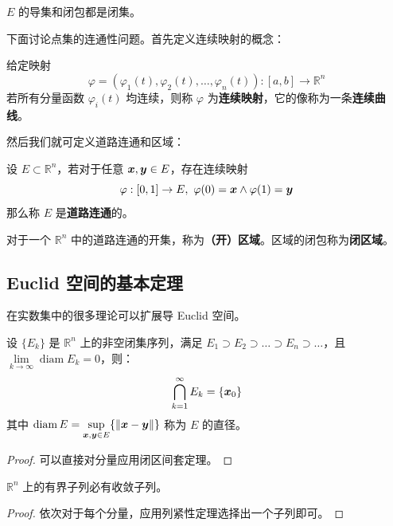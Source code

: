 \begin{theorem}
    $E$ 的导集和闭包都是闭集。
\end{theorem}

下面讨论点集的连通性问题。首先定义连续映射的概念：

\begin{definition}
    给定映射
    $$
    \varphi = (\varphi_1(t), \varphi_2(t), \dots, \varphi_n(t)): [a, b] \to \mathbb{R}^{n}
    $$
    若所有分量函数 $\varphi_i(t)$ 均连续，则称 $\varphi$ 为\textbf{连续映射}，它的像称为一条\textbf{连续曲线}。
\end{definition}

然后我们就可定义道路连通和区域：

\begin{definition}[道路连通]
    设 $E \subset \mathbb{R}^{n}$，若对于任意 $\boldsymbol{x}, \boldsymbol{y} \in E$，存在连续映射
    $$
    \varphi: [0, 1] \to E,\ \varphi(0) = \boldsymbol{x} \land \varphi(1) = \boldsymbol{y}
    $$
    那么称 $E$ 是\textbf{道路连通}的。
\end{definition}

\begin{definition}[区域]
    对于一个 $\mathbb{R}^{n}$ 中的道路连通的开集，称为\textbf{（开）区域}。区域的闭包称为\textbf{闭区域}。
\end{definition}

\subsection{Euclid 空间的基本定理}

在实数集中的很多理论可以扩展导 Euclid 空间。

\begin{theorem}[闭集套定理]
    设 $\{E_k\}$ 是 $\mathbb{R}^{n}$ 上的非空闭集序列，满足 $E_1 \supset E_2 \supset \dots \supset E_n \supset \dots$，且 $\lim\limits_{k \to \infty} \operatorname{diam} E_k = 0$，则：
    $$ 
    \bigcap_{k=1}^{\infty} E_k = \{\boldsymbol{x}_0\}
    $$
    其中 $\operatorname{diam} E = \sup\limits_{\boldsymbol{x}, \boldsymbol{y} \in E} \{\norm{\boldsymbol{x} - \boldsymbol{y}}\}$ 称为 $E$ 的直径。 

    \begin{proof}
        可以直接对分量应用闭区间套定理。
    \end{proof}
\end{theorem}

\begin{theorem}
    $\mathbb{R}^{n}$ 上的有界子列必有收敛子列。

    \begin{proof}
        依次对于每个分量，应用列紧性定理选择出一个子列即可。
    \end{proof}
\end{theorem}

